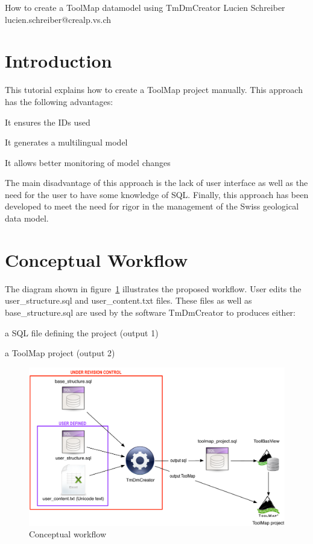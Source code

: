 \documentclass[a4paper, 12pt]{article}
\begin{document}
 {How to create a ToolMap datamodel using TmDmCreator} {Lucien Schreiber} {lucien.schreiber@crealp.vs.ch}
\tableofcontents
\pagebreak

\section{Introduction}
This tutorial explains how to create a ToolMap project manually. This approach has the following advantages:
\begin{enumerate*}
  \item It ensures the IDs used
  \item It generates a multilingual model
  \item It allows better monitoring of model changes
\end{enumerate*}
The main disadvantage of this approach is the lack of user interface as well as the need for the user to have some knowledge of SQL. Finally, this approach has been developed to meet the need for rigor in the management of the Swiss geological data model.


\section{Conceptual Workflow}
The diagram shown in figure~\ref{fig:conceptual-workflow} illustrates the proposed workflow. User edits the user\_structure.sql and user\_content.txt files. These files as well as base\_structure.sql are used by the software TmDmCreator to produces either:
\begin{enumerate*}
  \item	a SQL file defining the project (output 1)
  \item	a ToolMap project (output 2)
\end{enumerate*}

\begin{figure} [htbp]
	\centering
    \includegraphics[width=1\textwidth]{img/workflow.pdf}
    \caption{Conceptual workflow}
    \label{fig:conceptual-workflow}
\end{figure}
\end{document}
